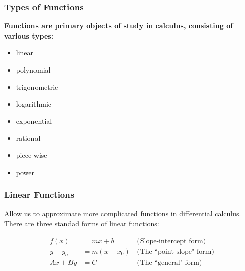 \documentclass{beamer}
\begin{document}
\begin{frame}[fragile]\frametitle{Types of Functions}

\vfill
\begin{center}\textbf{Functions are primary objects of study in calculus, consisting of various types:} \end{center}

\vfill
\begin{itemize}
\item linear
\item polynomial
\item trigonometric
\item logarithmic
\item exponential
\item rational
\item piece-wise
\item power
\end{itemize}

\end{frame}

\begin{frame}[fragile]\frametitle{Linear Functions}

\vfill
Allow us to approximate more complicated functions in differential calculus. There are three standad forms of linear functions:

\vfill
\begin{align*}
  f(x) &= mx + b &\,\text{(Slope-intercept form)} \\
  y - y_o &= m(x - x_0) &\, \text{(The ``point-slope" form)} \\
  Ax + By &= C &\, \text{(The ``general" form)}
\end{align*}

\end{frame}
\end{document}
